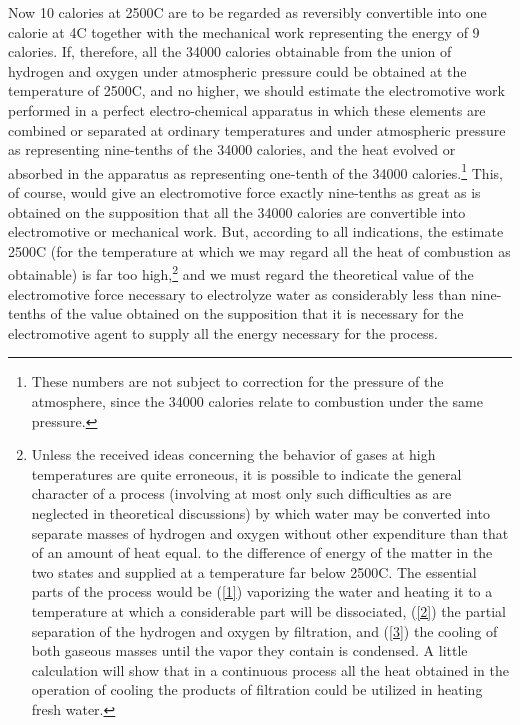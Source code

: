 \documentclass[12pt]{article}
\begin{document}
Now 10 calories at 2500\degree C are to be regarded as reversibly convertible into one calorie at 4\degree C together with the mechanical work representing the energy of 9 calories. If, therefore, all the 34000 calories obtainable from the union of hydrogen and oxygen under atmospheric pressure could be obtained at the temperature of
2500\degree C, and no higher, we should estimate the electromotive work performed in a perfect electro-chemical apparatus in which these elements are combined or separated at ordinary temperatures and under atmospheric pressure as representing nine-tenths of the 34000 calories, and the heat evolved or absorbed in the apparatus as representing one-tenth of the 34000 calories.\footnote{These numbers are not subject to correction for the pressure of the atmosphere, since the 34000 calories relate to combustion under the same pressure.} This, of course, would give an electromotive force exactly nine-tenths as great as is obtained on the supposition that all the 34000 calories are convertible into electromotive or mechanical work. But, according to all indications, the estimate 2500\degree C (for the temperature at which we may regard all the heat of combustion as obtainable) is far too high,\footnote{Unless the received ideas concerning the behavior of gases at high temperatures are quite erroneous, it is possible to indicate the general character of a process (involving at most only such difficulties as are neglected in theoretical discussions) by which water may be converted into separate masses of hydrogen and oxygen without other expenditure than that of an amount of heat equal. to the difference of energy of the matter in the two states and supplied at a temperature far below 2500\degree C. The essential parts of the process would be (\ref{1}) vaporizing the water and heating it to a temperature at which a considerable part will be dissociated, (\ref{2}) the partial separation of the hydrogen and oxygen by filtration, and (\ref{3}) the cooling of both gaseous masses until the vapor they contain is condensed. A little calculation will show that in a continuous process all the heat obtained in the operation of cooling the products of filtration could be utilized in heating fresh water.} 
and we must regard the theoretical value of the electromotive force necessary to electrolyze water as considerably less than nine-tenths of the value obtained on the supposition that it is necessary for the electromotive agent to supply all the energy necessary for the process.
\end{document}
